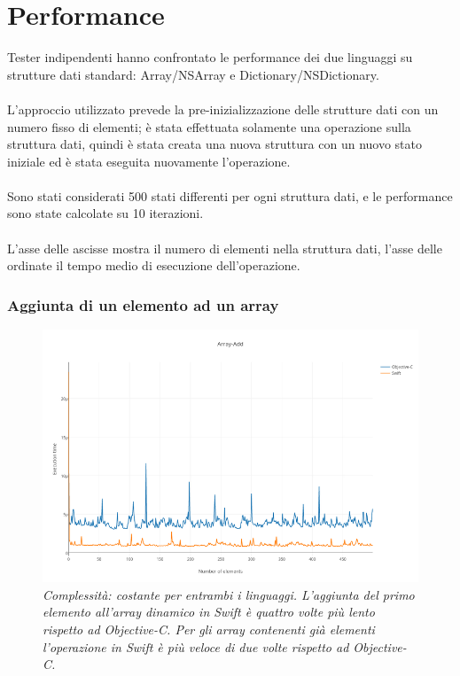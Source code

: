 \section{Performance}
Tester indipendenti hanno confrontato le performance dei due linguaggi su strutture dati standard: Array/NSArray e Dictionary/NSDictionary.\\\\
L'approccio utilizzato prevede la pre-inizializzazione delle strutture dati con un numero fisso di elementi; è stata effettuata solamente una operazione sulla struttura dati, quindi è stata creata una nuova struttura con un nuovo stato iniziale ed è stata eseguita nuovamente l'operazione.\\\\ Sono stati considerati 500 stati differenti per ogni struttura dati, e le performance sono state calcolate su 10 iterazioni.\\\\L'asse delle ascisse mostra il numero di elementi nella struttura dati, l'asse delle ordinate il tempo medio di esecuzione dell'operazione.
\subsubsection{Aggiunta di un elemento ad un array}
\begin{figure}[H]
      \centering
      \includegraphics[scale=0.50]{immagini/array_add.png}
            \vspace{0.8cm}
            \caption{\textit{Complessità: costante per entrambi i linguaggi. L'aggiunta del primo elemento all'array dinamico in Swift è quattro volte più lento rispetto ad Objective-C.
Per gli array contenenti già elementi l'operazione in Swift è più veloce di due volte rispetto ad Objective-C.}}
\end{figure}

